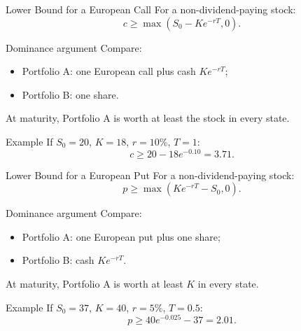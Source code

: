\documentclass[aspectratio=169,11pt]{beamer}
\begin{document}
\begin{frame}{Lower Bound for a European Call}
    For a non-dividend-paying stock:
    \[
        c\geq \max(S_0-Ke^{-rT},0).
    \]

    \begin{block}{Dominance argument}
        Compare:
        \begin{itemize}
            \item Portfolio A: one European call plus cash \(Ke^{-rT}\);
            \item Portfolio B: one share.
        \end{itemize}
        At maturity, Portfolio A is worth at least the stock in every state.
    \end{block}

    \begin{exampleblock}{Example}
        If \(S_0=20\), \(K=18\), \(r=10\%\), \(T=1\):
        \[
            c\geq 20-18e^{-0.10}=3.71.
        \]
    \end{exampleblock}
\end{frame}

\begin{frame}{Lower Bound for a European Put}
    For a non-dividend-paying stock:
    \[
        p\geq \max(Ke^{-rT}-S_0,0).
    \]

    \begin{block}{Dominance argument}
        Compare:
        \begin{itemize}
            \item Portfolio A: one European put plus one share;
            \item Portfolio B: cash \(Ke^{-rT}\).
        \end{itemize}
        At maturity, Portfolio A is worth at least \(K\) in every state.
    \end{block}

    \begin{exampleblock}{Example}
        If \(S_0=37\), \(K=40\), \(r=5\%\), \(T=0.5\):
        \[
            p\geq 40e^{-0.025}-37=2.01.
        \]
    \end{exampleblock}
\end{frame}
\end{document}
